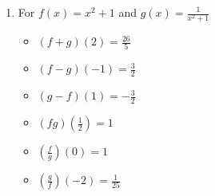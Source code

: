 \begin{enumerate}
\begin{multicols}{3}
\begin{itemize}

\item  $(f+g)(2) =\frac{17}{4}$
\item  $(f-g)(-1) = 0$
\item  $(g-f)(1) = 0$

\end{itemize}
\end{multicols}

\begin{multicols}{3}
\begin{itemize}

\item  $(fg)\left(\frac{1}{2}\right) =1$
\item  $\left(\frac{f}{g}\right)(0)$ is undefined.
\item  $\left(\frac{g}{f}\right)\left(-2\right) = \frac{1}{16}$

\end{itemize}
\end{multicols}

\item For  $f(x) = x^2+1$ and $g(x) = \frac{1}{x^2+1}$

\begin{multicols}{3}
\begin{itemize}

\item  $(f+g)(2) =\frac{26}{5}$
\item  $(f-g)(-1) = \frac{3}{2}$
\item  $(g-f)(1) = -\frac{3}{2}$

\end{itemize}
\end{multicols}

\begin{multicols}{3}
\begin{itemize}

\item  $(fg)\left(\frac{1}{2}\right) =1$
\item  $\left(\frac{f}{g}\right)(0) = 1$
\item  $\left(\frac{g}{f}\right)\left(-2\right) = \frac{1}{25}$

\end{itemize}
\end{multicols}

\setcounter{HW}{\value{enumi}}
\end{enumerate}

